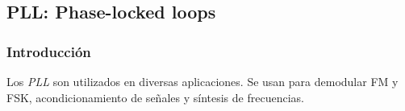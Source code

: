 

	\subsection{PLL: Phase-locked loops}
	\subsubsection{Introducción}
	Los \emph{PLL} son utilizados en diversas aplicaciones. Se usan para demodular FM y FSK, acondicionamiento de señales y síntesis de frecuencias. 
